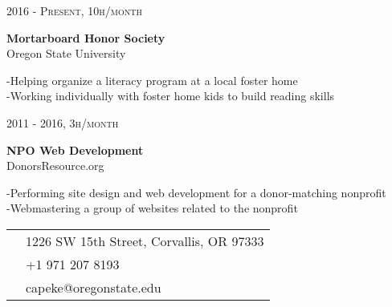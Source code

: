 \documentclass[10pt]{article} %
\begin{document}
{\begin{minipage}[t]{0.5\textwidth}
{\raggedleft\textsc{2016 - Present, 10h/month}\par}
{\raggedright\large \textbf{Mortarboard Honor Society}\\
{Oregon State University}\\[5pt]}
\hspace*{0.2in}-Helping organize a literacy program at a local foster home\\
\hspace*{0.2in}-Working individually with foster home kids to build reading skills\\

{\raggedleft\textsc{2011 - 2016, 3h/month}\par}
{\raggedright\large \textbf{NPO Web Development}\\
{DonorsResource.org}\\[5pt]}
\hspace*{0.2in}-Performing site design and web development for a donor-matching nonprofit\\
\hspace*{0.2in}-Webmastering a group of websites related to the nonprofit\\

\end{minipage} %
\hfill
\begin{minipage}[t]{0.44\textwidth} %
\vspace{0pt} %


\colorbox{shade}{\textcolor{text1}{
\begin{tabular}{c|p{7cm}}
\raisebox{-4pt}{} & 1226 SW 15th Street, Corvallis, OR 97333\\ %
\raisebox{-3pt}{\Mobilefone} & +1 971 207 8193\\ %
\raisebox{-1pt}{\Letter} & capeke@oregonstate.edu \\ %
\end{tabular}
}
}\\[10pt]



\end{minipage}}
\end{document}
